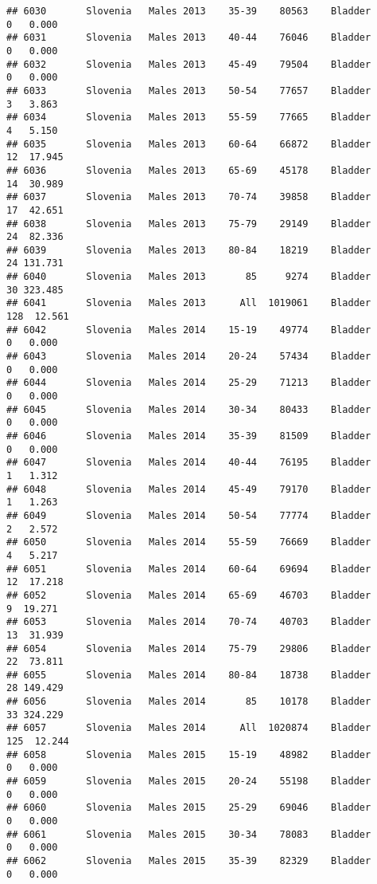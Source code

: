 \documentclass[
]{article}
\begin{document}
\begin{verbatim}
## 6030       Slovenia   Males 2013    35-39    80563    Bladder      0   0.000
## 6031       Slovenia   Males 2013    40-44    76046    Bladder      0   0.000
## 6032       Slovenia   Males 2013    45-49    79504    Bladder      0   0.000
## 6033       Slovenia   Males 2013    50-54    77657    Bladder      3   3.863
## 6034       Slovenia   Males 2013    55-59    77665    Bladder      4   5.150
## 6035       Slovenia   Males 2013    60-64    66872    Bladder     12  17.945
## 6036       Slovenia   Males 2013    65-69    45178    Bladder     14  30.989
## 6037       Slovenia   Males 2013    70-74    39858    Bladder     17  42.651
## 6038       Slovenia   Males 2013    75-79    29149    Bladder     24  82.336
## 6039       Slovenia   Males 2013    80-84    18219    Bladder     24 131.731
## 6040       Slovenia   Males 2013       85     9274    Bladder     30 323.485
## 6041       Slovenia   Males 2013      All  1019061    Bladder    128  12.561
## 6042       Slovenia   Males 2014    15-19    49774    Bladder      0   0.000
## 6043       Slovenia   Males 2014    20-24    57434    Bladder      0   0.000
## 6044       Slovenia   Males 2014    25-29    71213    Bladder      0   0.000
## 6045       Slovenia   Males 2014    30-34    80433    Bladder      0   0.000
## 6046       Slovenia   Males 2014    35-39    81509    Bladder      0   0.000
## 6047       Slovenia   Males 2014    40-44    76195    Bladder      1   1.312
## 6048       Slovenia   Males 2014    45-49    79170    Bladder      1   1.263
## 6049       Slovenia   Males 2014    50-54    77774    Bladder      2   2.572
## 6050       Slovenia   Males 2014    55-59    76669    Bladder      4   5.217
## 6051       Slovenia   Males 2014    60-64    69694    Bladder     12  17.218
## 6052       Slovenia   Males 2014    65-69    46703    Bladder      9  19.271
## 6053       Slovenia   Males 2014    70-74    40703    Bladder     13  31.939
## 6054       Slovenia   Males 2014    75-79    29806    Bladder     22  73.811
## 6055       Slovenia   Males 2014    80-84    18738    Bladder     28 149.429
## 6056       Slovenia   Males 2014       85    10178    Bladder     33 324.229
## 6057       Slovenia   Males 2014      All  1020874    Bladder    125  12.244
## 6058       Slovenia   Males 2015    15-19    48982    Bladder      0   0.000
## 6059       Slovenia   Males 2015    20-24    55198    Bladder      0   0.000
## 6060       Slovenia   Males 2015    25-29    69046    Bladder      0   0.000
## 6061       Slovenia   Males 2015    30-34    78083    Bladder      0   0.000
## 6062       Slovenia   Males 2015    35-39    82329    Bladder      0   0.000

\end{verbatim}
\end{document}
